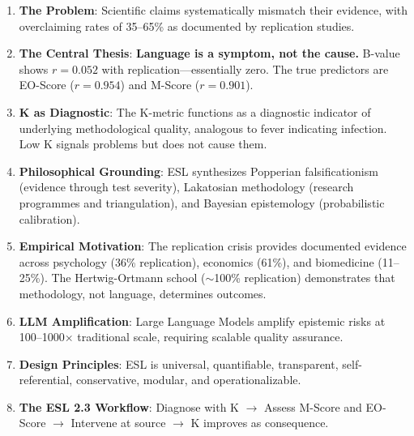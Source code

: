\documentclass[11pt,a4paper]{article}
\begin{document}
\begin{enumerate}
    \item \textbf{The Problem}: Scientific claims systematically mismatch their evidence, with overclaiming rates of 35--65\% as documented by replication studies.

    \item \textbf{The Central Thesis}: \textbf{Language is a symptom, not the cause.} B-value shows $r = 0.052$ with replication---essentially zero. The true predictors are EO-Score ($r = 0.954$) and M-Score ($r = 0.901$).

    \item \textbf{K as Diagnostic}: The K-metric functions as a diagnostic indicator of underlying methodological quality, analogous to fever indicating infection. Low K signals problems but does not cause them.

    \item \textbf{Philosophical Grounding}: ESL synthesizes Popperian falsificationism (evidence through test severity), Lakatosian methodology (research programmes and triangulation), and Bayesian epistemology (probabilistic calibration).

    \item \textbf{Empirical Motivation}: The replication crisis provides documented evidence across psychology (36\% replication), economics (61\%), and biomedicine (11--25\%). The Hertwig-Ortmann school ($\sim$100\% replication) demonstrates that methodology, not language, determines outcomes.

    \item \textbf{LLM Amplification}: Large Language Models amplify epistemic risks at 100--1000$\times$ traditional scale, requiring scalable quality assurance.

    \item \textbf{Design Principles}: ESL is universal, quantifiable, transparent, self-referential, conservative, modular, and operationalizable.

    \item \textbf{The ESL 2.3 Workflow}: Diagnose with K $\rightarrow$ Assess M-Score and EO-Score $\rightarrow$ Intervene at source $\rightarrow$ K improves as consequence.
\end{enumerate}
\end{document}
